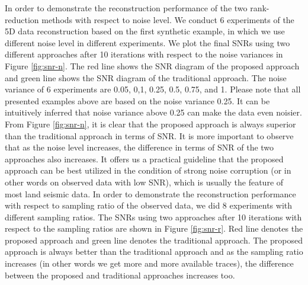 In order to demonstrate the reconstruction performance of the two rank-reduction methods with respect to noise level. We conduct 6 experiments of the 5D data reconstruction based on the first synthetic example, in which we use different noise level in different experiments. We plot the final SNRs using two different approaches after 10 iterations with respect to the noise variances in Figure \ref{fig:snr-n}. The red line shows the SNR diagram of the proposed approach and green line shows the SNR diagram of the traditional approach. The noise variance of 6 experiments are 0.05, 0,1, 0.25, 0.5, 0.75, and 1. Please note that all presented examples above are based on the noise variance 0.25. It can be intuitively inferred that noise variance above 0.25 can make the data even noisier. From Figure \ref{fig:snr-n}, it is clear that the proposed approach is always superior than the traditional approach in terms of SNR. It is more important to observe that as the noise level increases, the difference in terms of SNR of the two approaches also increases. It offers us a practical guideline that the proposed approach can be best utilized in the condition of strong noise corruption (or in other words on observed data with low SNR), which is usually the feature of most land seismic data. In order to demonstrate the reconstruction performance with respect to sampling ratio of the observed data, we did 8 experiments with different sampling ratios. The SNRs using two approaches after 10 iterations with respect to the sampling ratios are shown in Figure \ref{fig:snr-r}. Red line denotes the proposed approach and green line denotes the traditional approach. The proposed approach is always better than the traditional approach and as the sampling ratio increases (in other words we get more and more available traces), the difference between the proposed and traditional approaches increases too. 

